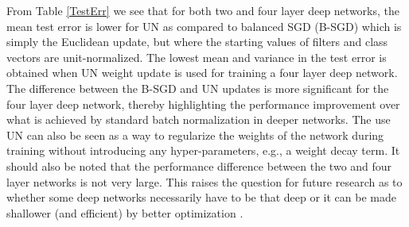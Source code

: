 \documentclass{article} %
\newcommand{\changeBM}[1]{#1} %
\newcommand{\changeVB}[1]{#1} %
\begin{document}
%
\changeVB{
From Table \ref{TestErr} we see that for both two and four layer deep networks, the mean test error is lower for UN as compared to balanced SGD (B-SGD) which is simply the Euclidean update, but where the starting values of filters and class vectors are unit-normalized. The lowest mean and variance in the test error is obtained when UN weight update is used for training a four layer deep network. The difference between the B-SGD and UN updates is more significant for the four layer deep network, thereby highlighting the performance improvement over what is achieved by \changeBM{standard} batch normalization in deeper networks. The use UN can also be seen as \changeBM{a} way to regularize the weights of the network during training without introducing any hyper-parameters, \changeBM{e.g., a weight decay term}.} It should also be noted that the performance difference between the two and four layer networks is not very large. This raises the question for future research as to whether some deep networks necessarily have to be that deep or it can be made shallower (and efficient) by better optimization \cite{Caruana}. 
\end{document}
